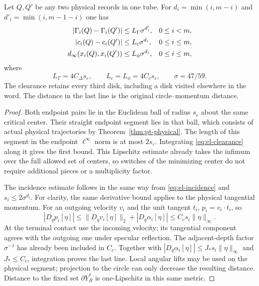 \begin{lemma}
\label{lem:cv-tube-observations}
Let $Q,Q'$ be any two physical records in one tube.  For
$d_i=\min(i,m-i)$ and $d'_i=\min(i,m-1-i)$ one has
\begin{align}
 |\Gamma_i(Q)-\Gamma_i(Q')|
       &\le L_\Gamma\sigma^{d'_i},&&0\le i<m,\notag\\
 |c_i(Q)-c_i(Q')|
       &\le L_c\sigma^{d_i},&&0\le i\le m,\label{eq:cv-observation-transport}\\
 d_\infty(x_i(Q),x_i(Q'))
       &\le L_\phi\sigma^{d_i},&&0\le i\le m,\notag
\end{align}
where
\begin{equation}\label{eq:cv-L}
 L_\Gamma=4C_\Delta s_\varepsilon,
 \qquad L_c=L_\phi=4C_c s_\varepsilon,
 \qquad\sigma=47/59.
\end{equation}
The clearance retains every third disk, including a disk visited
elsewhere in the word.  The distance in the last line is the
original circle--momentum distance.
\end{lemma}
\begin{proof}
Both endpoint pairs lie in the Euclidean ball of radius
$s_\varepsilon$ about the same critical center.  Their straight
endpoint segment lies in that ball, which consists of actual
physical trajectories by Theorem~\ref{thm:pt-physical}.
The length of this segment in the endpoint $\ell^\infty$ norm is
at most $2s_\varepsilon$.  Integrating
\eqref{eq:el-clearance} along it gives the first bound.  This
Lipschitz estimate already takes the infimum over the full allowed
set of centers, so switches of the minimizing center do not require
additional pieces or a multiplicity factor.

The incidence estimate follows in the same way from
\eqref{eq:el-incidence} and $s_i\le2\sigma^{d_i}$.
For clarity, the same derivative bound applies to the physical
tangential momentum.  For an outgoing velocity $v_i$ and the unit
tangent $t_i$, $p_i=v_i\cdot t_i$, so
\[
 |D_qp_i[\eta]|
       \le\|D_qv_i[\eta]\|_2+|D_q\alpha_i[\eta]|
       \le C_cs_i\|\eta\|_\infty.
\]
At the terminal contact use the incoming velocity; its tangential
component agrees with the outgoing one under specular reflection.
The adjacent-depth factor $\sigma^{-1}$ has already been included
in $C_c$.  Together with
$|D_q\alpha_i[\eta]|\le J_*s_i\|\eta\|_\infty$ and $J_*\le C_c$,
integration proves the last line.  Local angular lifts may be used
on the physical segment; projection to the circle can only decrease
the resulting distance.  Distance to the fixed set $\partial Y_R^*$
is one-Lipschitz in this same metric.
\end{proof}

